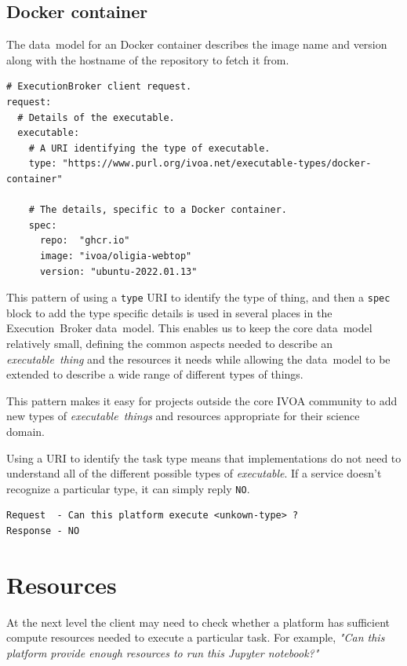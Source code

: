 \documentclass[11pt,a4paper]{ivoa}
\newcommand{\datamodel} {data~model}
\newcommand{\ivoa} {IVOA}
\newcommand{\executionbroker} {Execution~Broker}
\newcommand{\jupyternotebook} {Jupyter notebook}
\newcommand{\dockercontainer} {Docker container}
\newcommand{\codeword}[1] {\texttt{#1}}
\newcommand{\executable} {\textit{executable}}
\newcommand{\executablething}[1] {\textit{executable~thing#1}}
\begin{document}
\subsection{\dockercontainer{}}
\label{dockercontainer}
The \datamodel{} for an \dockercontainer{} describes the image name and version
along with the hostname of the repository to fetch it from.

\begin{lstlisting}[]
# ExecutionBroker client request.
request:
  # Details of the executable.
  executable:
    # A URI identifying the type of executable.
    type: "https://www.purl.org/ivoa.net/executable-types/docker-container"

    # The details, specific to a Docker container.
    spec:
      repo:  "ghcr.io"
      image: "ivoa/oligia-webtop"
      version: "ubuntu-2022.01.13"
\end{lstlisting}

This pattern of using a \codeword{type} URI to identify the type of thing, and then a
\codeword{spec} block to add the type specific details is used in several places in the
\executionbroker{} \datamodel{}.
This enables us to keep the core \datamodel{} relatively small, defining the common aspects
needed to describe an \executablething{} and the resources it needs while allowing the
\datamodel{} to be extended to describe a wide range of different types of things.

This pattern makes it easy for projects outside the core \ivoa{} community to add new
types of \executablething{s} and resources appropriate for their science domain.

Using a URI to identify the task type means that implementations do not need to understand
all of the different possible types of \executable{}.
If a service doesn’t recognize a particular type, it can simply reply \codeword{NO}.

\begin{lstlisting}[]
Request  - Can this platform execute <unkown-type> ?
Response - NO
\end{lstlisting}

\section{Resources}
\label{resources}

At the next level the client may need to check whether a platform has sufficient compute resources
needed to execute a particular task.
For example, \textit{"Can this platform provide enough resources to run this \jupyternotebook{}?"}
\end{document}
